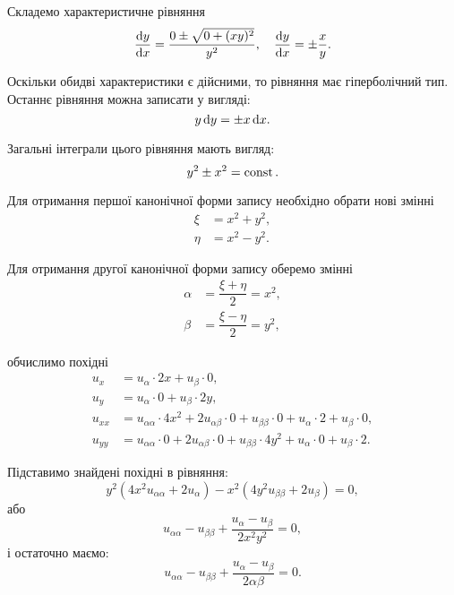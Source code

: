 \begin{solution}
	Складемо характеристичне рівняння
	\begin{equation*}
		\dfrac{\mathop{}\!\mathrm{d} y}{\mathop{}\!\mathrm{d} x} = \dfrac{0\pm\sqrt{0+(xy)^2}}{y^2}, \quad \dfrac{\mathop{}\!\mathrm{d} y}{\mathop{}\!\mathrm{d} x} = \pm\dfrac{x}{y}.
	\end{equation*}

	Оскільки обидві характеристики є дійсними, то рівняння має гіперболічний тип. Останнє рівняння можна записати у вигляді:
	\begin{equation*}
		y \mathop{}\!\mathrm{d} y = \pm x \mathop{}\!\mathrm{d} x.
	\end{equation*}

	Загальні інтеграли цього рівняння мають вигляд:
	\begin{equation*}
		y^2 \pm x^2 = \operatorname{const}.
	\end{equation*}

	Для отримання першої канонічної форми запису необхідно обрати нові змінні
	\begin{align*}
		\xi &= x^2 + y^2,\\
		\eta &= x^2 - y^2.
	\end{align*}

	Для отримання другої канонічної форми запису оберемо змінні
	\begin{align*}
		\alpha &= \dfrac{\xi + \eta}{2} = x^2, \\
		\beta &= \dfrac{\xi-\eta}{2} = y^2,
	\end{align*}

	обчислимо похідні 
	\begin{align*}
		u_x &= u_\alpha \cdot 2 x + u_\beta \cdot 0, \\
		u_y &= u_\alpha \cdot 0 + u_\beta \cdot 2 y, \\
		u_{xx} &= u_{\alpha\alpha} \cdot 4x^2 + 2 u_{\alpha\beta} \cdot 0 + u_{\beta\beta} \cdot 0 + u_\alpha \cdot 2 + u_\beta \cdot 0, \\
		u_{yy} &= u_{\alpha\alpha} \cdot 0 + 2 u_{\alpha\beta} \cdot 0 + u_{\beta\beta} \cdot 4y^2 + u_\alpha \cdot 0 + u_\beta \cdot 2.
	\end{align*}

	Підставимо знайдені похідні в рівняння:
	\begin{equation*}
		y^2(4x^2u_{\alpha\alpha} + 2u_\alpha) - x^2(4y^2u_{\beta\beta} + 2u_\beta) = 0,
	\end{equation*}
	або
	\begin{equation*}
		u_{\alpha\alpha} - u_{\beta\beta} + \dfrac{u_\alpha - u_\beta}{2x^2y^2} = 0,
	\end{equation*}
	і остаточно маємо:
	\begin{equation*}
		u_{\alpha\alpha} - u_{\beta\beta} + \dfrac{u_\alpha - u_\beta}{2\alpha\beta} = 0.
	\end{equation*}
\end{solution}

